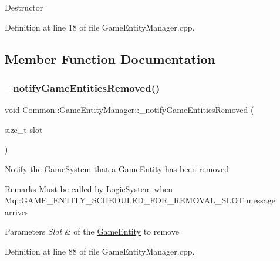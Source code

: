 Destructor 

Definition at line 18 of file Game\+Entity\+Manager.\+cpp.



\subsection{Member Function Documentation}
\mbox{\label{class_common_1_1_game_entity_manager_ac1cb3aaa00139aaaca96a96e391fa2dc}} 
\subsubsection{\texorpdfstring{\+\_\+notify\+Game\+Entities\+Removed()}{\_notifyGameEntitiesRemoved()}}
{\footnotesize\ttfamily void Common\+::\+Game\+Entity\+Manager\+::\+\_\+notify\+Game\+Entities\+Removed (\begin{DoxyParamCaption}\item[{size\+\_\+t}]{slot }\end{DoxyParamCaption})}

Notify the Game\+System that a \hyperlink{struct_common_1_1_game_entity}{Game\+Entity} has been removed \begin{DoxyRemark}{Remarks}
Must be called by \hyperlink{class_common_1_1_logic_system}{Logic\+System} when Mq\+::\+G\+A\+M\+E\+\_\+\+E\+N\+T\+I\+T\+Y\+\_\+\+S\+C\+H\+E\+D\+U\+L\+E\+D\+\_\+\+F\+O\+R\+\_\+\+R\+E\+M\+O\+V\+A\+L\+\_\+\+S\+L\+OT message arrives 
\end{DoxyRemark}

\begin{DoxyParams}{Parameters}
{\em Slot} & of the \hyperlink{struct_common_1_1_game_entity}{Game\+Entity} to remove \\
\hline
\end{DoxyParams}


Definition at line 88 of file Game\+Entity\+Manager.\+cpp.

\mbox{\label{class_common_1_1_game_entity_manager_a982abe1d421f8a59fb1ca21ebca97b5f}} 

